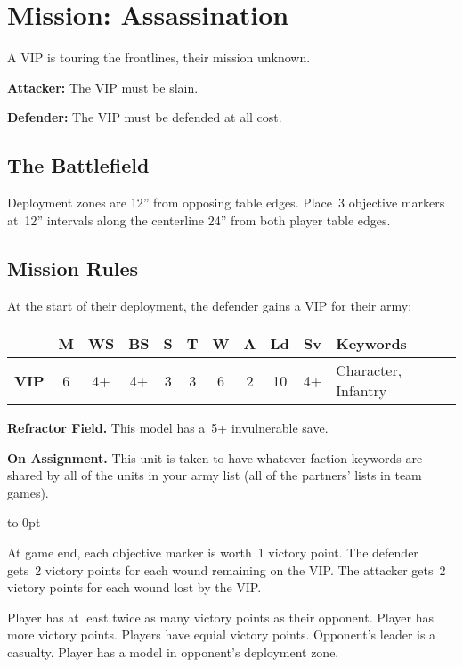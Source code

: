\clearpage
\section{Mission: Assassination}

  A VIP is touring the frontlines, their mission unknown.
  \begin{squishitemize}
  \item {\bf Attacker:} The VIP must be slain.
  \item {\bf Defender:} The VIP must be defended at all cost.
  \end{squishitemize}

\subsection{\bf The Battlefield}%

Deployment zones are 12'' from opposing table edges.  Place~3
objective markers at~12'' intervals along the centerline 24'' from
both player table edges.

\subsection{\bf Mission Rules}%

At the start of their deployment, the defender gains a VIP for their army:

\vspace*{-9pt}
\begin{center}    
  \begin{tabular}[t]{O{1.5in}cccccccccE{2.5in}}
    & {\bf M} & {\bf WS} & {\bf BS} & {\bf S} & {\bf T} & {\bf W} & {\bf A} & {\bf Ld} & {\bf Sv} & {\bf Keywords}\\
\hline
    {\bf VIP} & 6 & 4+ & 4+ & 3 & 3 & 6 & 2 & 10 & 4+ & Character, Infantry\\
  \end{tabular}
  \end{center}

  \vspace*{-9pt}
  \hfill
  \begin{minipage}{6in}
    \noindent\textbf{Refractor Field.} This model has a~5+ invulnerable
    save.

    \noindent\textbf{On Assignment.}  This unit is taken to have whatever
    faction keywords are shared by all of the units in your army list
    (all of the partners' lists in team games).
  \end{minipage}
  \hfill\hbox to 0pt{}

  At game end, each objective marker is worth~1 victory point.  The
  defender gets~2 victory points for each wound remaining on the VIP.
  The attacker gets~2 victory points for each wound lost by the VIP.

\vfill  
\scoringbox%
{Player has at least twice as many victory points as their opponent.}%
{Player has more victory points.}%
{Players have equial victory points.}%
{Opponent's leader is a casualty.}%
{Player has a model in opponent's deployment zone.}


